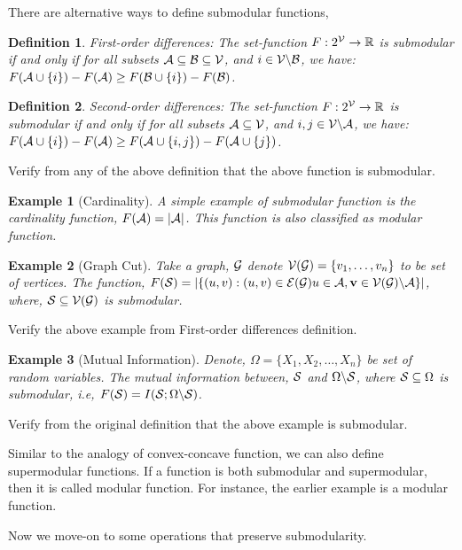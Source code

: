 \documentclass[11pt]{article}
\newtheorem{definition}{Definition}{\bf}{\it}
\newtheorem{example}{Example}{\bf}{\rm}
\begin{document}
There are alternative ways to define 
submodular functions,

\begin{definition}{First-order differences:} The set-function $F: 2^{\V} \to \R$ is submodular if and only if
for all subsets $\A \subseteq \B \subseteq \V$, and $i \in \V \backslash \B$, we have: $F(\A \cup \{i\}) - F(\A) \geq F(\B \cup \{i\}) - F(\B)$.
\end{definition}

\begin{definition}{Second-order differences:} The set-function $F: 2^{\V} \to \R$ is submodular if and only if
for all subsets $\A \subseteq \V$, and $i, j \in \V \backslash \A$, we have: 
$F(\A \cup \{i\}) - F(\A) \geq F(\A \cup \{i, j\}) - F(\A \cup \{j\})$.
\end{definition}

Verify from any of the above definition that the above function is submodular.

\begin{example}[Cardinality]
A simple example of submodular function is the cardinality function, $F(\A) = |\A|$.
This function is also classified as modular function.
\end{example}

\begin{example}[Graph Cut]
Take a graph, $\G$ denote $\V(\G) = \{v_1, \dots, v_n\}$ 
to be set of vertices. The function, $F(\S) = |\{(u, v): (u, v) \in \E(\G) u \in \A, \v \in \V(\G)\backslash \A\}|$,
where, $\S \subseteq \V(\G)$ is submodular.
\end{example}
Verify the above example from First-order differences definition.

\begin{example}[Mutual Information]
Denote, $\Omega = \{X_1, X_2, \dots, X_n\}$ be set of 
random variables. The mutual information between, $\S$ and $\Omega \backslash \S$, where $\S \subseteq \Omega$
is submodular, i.e, $F(\S) = I(\S; \Omega \backslash \S)$.
\end{example}

Verify from the original definition that the above example is submodular.

Similar to the analogy of convex-concave function, we can also define supermodular functions.
If a function is both submodular and supermodular, then it is called modular function. For instance, the earlier 
example is a modular function.

Now we move-on to some operations that preserve submodularity.
\end{document}

